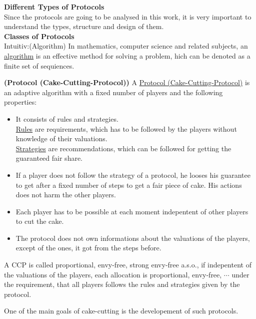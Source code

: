 \newpage
\textbf{Different Types of Protocols}\\
\newline
Since the protocols are going to be analysed in this work, it is very important to understand the types, structure and design of them.\\
\newline
\textbf{Classes of Protocols}\\
\newline
Intuitiv:(Algorithm)
\newline In mathematics, computer science and related subjects, an
\underline{algorithm} is an effective method for solving a problem, hich can be denoted as a finite set of sequiences.
\begin{defi}{\textbf{(Protocol (Cake-Cutting-Protocol))}}
\newline A \underline{Protocol (Cake-Cutting-Protocol)} is an adaptive algorithm with a fixed number of players and the following properties:
\begin{itemize}
\item{It consists of rules and strategies.\\ \underline{Rules} are requirements, which has to be followed by the players without knowledge of their valuations.\\
\underline{Strategies} are recommendations, which can be followed for getting the guaranteed fair share.}
\item{If a player does not follow the strategy of a protocol, he looses his guarantee to get after a fixed number of steps to get a fair piece of cake. His actions does not harm the other players.}
\item Each player has to be possible at each moment indepentent of other players to cut the cake.
\item The protocol does not own informations about the valuations of the players, except of the ones, it got from the steps before.
\end{itemize}
\end{defi}
\begin{defi}
A CCP is called proportional, envy-free, strong envy-free a.s.o., if indepentent of the valuations of the players, each allocation is proportional, envy-free, $\cdots$ under the requirement, that all players follows the rules and strategies given by the protocol.
\end{defi}
One of the main goals of cake-cutting is the developement of such protocols.


